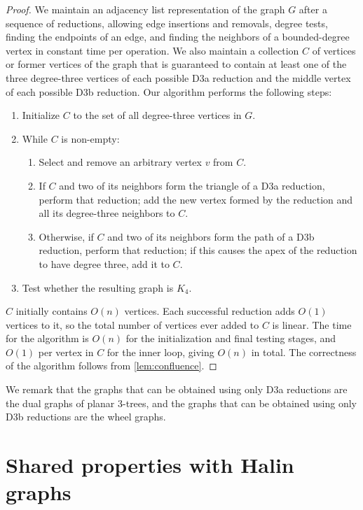 \documentclass{article}
\begin{document}
\begin{proof}
We maintain an adjacency list representation of the graph $G$ after a sequence of reductions, allowing edge insertions and removals, degree tests, finding the endpoints of an edge, and finding the neighbors of a bounded-degree vertex in constant time per operation. We also maintain a collection $C$ of vertices or former vertices of the graph that is guaranteed to contain at least one of the three degree-three vertices of each possible D3a reduction and the middle vertex of each possible D3b reduction. Our algorithm performs the following steps:
\begin{enumerate}
\item Initialize $C$ to the set of all degree-three vertices in $G$.
\item While $C$ is non-empty:
\begin{enumerate}
\item Select and remove an arbitrary vertex $v$ from $C$.
\item If $C$ and two of its neighbors form the triangle of a D3a reduction, perform that reduction; add the new vertex formed by the reduction and all its degree-three neighbors to $C$.
\item Otherwise, if $C$ and two of its neighbors form the path of a D3b reduction, perform that reduction; if this causes the apex of the reduction to have degree three, add it to $C$.
\end{enumerate}
\item Test whether the resulting graph is $K_4$.
\end{enumerate}
$C$ initially contains $O(n)$ vertices. Each successful reduction adds $O(1)$ vertices to it, so the total number of vertices ever added to $C$ is linear. The time for the algorithm is $O(n)$ for the initialization and final testing stages, and $O(1)$ per vertex in $C$ for the inner loop, giving $O(n)$ in total. The correctness of the algorithm follows from \autoref{lem:confluence}.
\end{proof}

We remark that the graphs that can be obtained using only D3a reductions are the dual graphs of planar 3-trees, and the graphs that can be obtained using only D3b reductions are the wheel graphs.

\section{Shared properties with Halin graphs}
\end{document}
